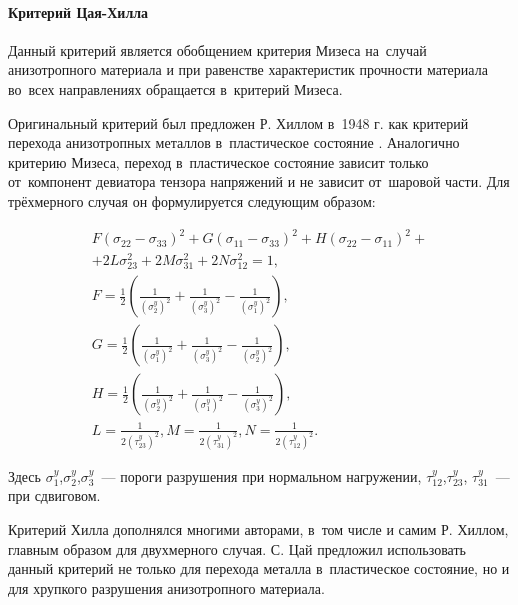 \documentclass[thesis.tex]{subfiles}
\begin{document}
\paragraph{Критерий Цая-Хилла}
Данный критерий является обобщением критерия Мизеса на~случай анизотропного материала и при равенстве характеристик
прочности материала во~всех направлениях обращается в~критерий Мизеса.

Оригинальный критерий был предложен Р. Хиллом в~1948 г. как критерий перехода анизотропных металлов в~пластическое
состояние \cite{hill1948theory}. Аналогично критерию Мизеса, переход в~пластическое состояние зависит только от~компонент
девиатора тензора напряжений и не зависит от~шаровой части. Для трёхмерного случая он формулируется следующим образом:
\begin{small}
\begin{gather}
    F(\sigma_{22}-\sigma_{33})^2+G(\sigma_{11}-\sigma_{33})^2+H(\sigma_{22}-\sigma_{11})^2+ \nonumber \\
    +2L\sigma_{23}^2+2M\sigma_{31}^2+2N\sigma_{12}^2 = 1, \nonumber \\
    F=\frac{1}{2}\left( \frac{1}{\left( \sigma_2^y \right)^2}+
                        \frac{1}{\left( \sigma_3^y \right)^2}-
                        \frac{1}{\left( \sigma_1^y \right)^2}\right), \nonumber \\
    G=\frac{1}{2}\left( \frac{1}{\left( \sigma_1^y \right)^2}+
                        \frac{1}{\left( \sigma_3^y \right)^2}-
                        \frac{1}{\left( \sigma_2^y \right)^2}\right), \\
    H=\frac{1}{2}\left( \frac{1}{\left( \sigma_2^y \right)^2}+
                        \frac{1}{\left( \sigma_1^y \right)^2}-
                        \frac{1}{\left( \sigma_3^y \right)^2}\right), \nonumber \\
    L=\frac{1}{2\left( \tau_{23}^y \right)^2},
    M=\frac{1}{2\left( \tau_{31}^y \right)^2},
    N=\frac{1}{2\left( \tau_{12}^y \right)^2}. \nonumber
\end{gather}
\end{small}
Здесь $\sigma_1^y$,$\sigma_2^y$,$\sigma_3^y$~--- пороги разрушения при нормальном нагружении, $\tau_{12}^y$,$\tau_{23}^y$,
$\tau_{31}^y$~--- при сдвиговом.

Критерий Хилла дополнялся многими авторами, в~том числе и самим Р. Хиллом, главным образом для двухмерного случая.
С. Цай предложил использовать данный критерий не только для перехода металла в~пластическое состояние, но и для хрупкого
разрушения анизотропного материала.
\end{document}
